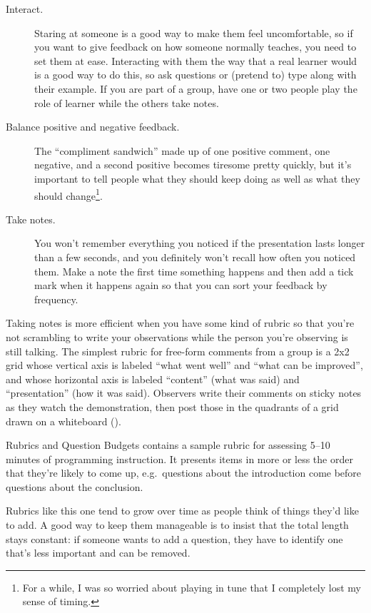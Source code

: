 \begin{description}

\item[Interact.]
  Staring at someone is a good way to make them feel uncomfortable,
  so if you want to give feedback on how someone normally teaches,
  you need to set them at ease.
  Interacting with them the way that a real learner would is a good way to do this,
  so ask questions or (pretend to) type along with their example.
  If you are part of a group,
  have one or two people play the role of learner
  while the others take notes.

\item[Balance positive and negative feedback.]
  The ``compliment sandwich'' made up of one positive comment,
  one negative,
  and a second positive
  becomes tiresome pretty quickly,
  but it's important to tell people what they should keep doing
  as well as what they should change\footnote{
    For a while,
    I was so worried about playing in tune that I completely lost my sense of timing.
  }.

\item[Take notes.]
  You won't remember everything you noticed
  if the presentation lasts longer than a few seconds,
  and you definitely won't recall how often you noticed them.
  Make a note the first time something happens
  and then add a tick mark when it happens again
  so that you can sort your feedback by frequency.

\end{description}

Taking notes is more efficient when you have some kind of rubric
so that you're not scrambling to write your observations
while the person you're observing is still talking.
The simplest rubric for free-form comments from a group
is a 2x2 grid whose vertical axis is labeled ``what went well'' and ``what can be improved'',
and whose horizontal axis is labeled ``content'' (what was said)
and ``presentation'' (how it was said).
Observers write their comments on sticky notes as they watch the demonstration,
then post those in the quadrants of a grid drawn on a whiteboard
().


\begin{aside}{Rubrics and Question Budgets}
   contains a sample rubric
  for assessing 5--10 minutes of programming instruction.
  It presents items in more or less the order that they're likely to come up,
  e.g.\ questions about the introduction come before questions about the conclusion.

  Rubrics like this one
  tend to grow over time as people think of things they'd like to add.
  A good way to keep them manageable is to insist that
  the total length stays constant:
  if someone wants to add a question,
  they have to identify one that's less important and can be removed.
\end{aside}

